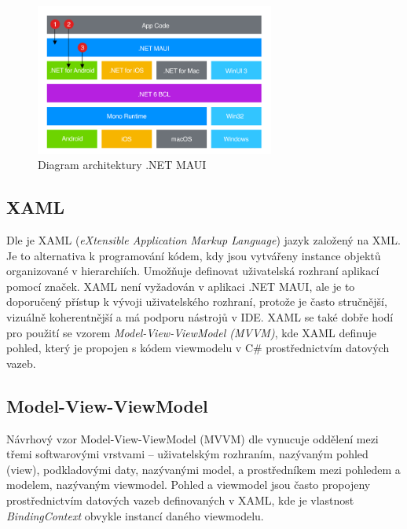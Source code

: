\begin{figure}[hbt]
\centering
\includegraphics[width=0.7\textwidth]{obrazky-figures/maui-architecture.png}
\caption{Diagram architektury .NET MAUI}
\label{mauiArchitectureDiagra}
\end{figure}

\subsection{XAML}
Dle \cite{xaml} je XAML ({\it eXtensible Application Markup Language}) jazyk založený na XML. Je to alternativa k programování kódem, kdy jsou vytvářeny instance objektů organizované v hierarchiích. Umožňuje definovat uživatelská rozhraní aplikací pomocí značek. XAML není vyžadován v aplikaci .NET MAUI, ale je to doporučený přístup k vývoji uživatelského rozhraní, protože je často stručnější, vizuálně koherentnější a má podporu nástrojů v IDE. XAML se také dobře hodí pro použití se vzorem {\it Model-View-ViewModel (MVVM)}, kde XAML definuje pohled, který je propojen s kódem viewmodelu v C\# prostřednictvím datových vazeb.

\subsection{Model-View-ViewModel}
Návrhový vzor Model-View-ViewModel (MVVM) dle \cite{mvvm} vynucuje oddělení mezi třemi softwarovými vrstvami – uživatelským rozhraním, nazývaným pohled (view), podkladovými daty, nazývanými model, a prostředníkem mezi pohledem a modelem, nazývaným viewmodel. Pohled a viewmodel jsou často propojeny prostřednictvím datových vazeb definovaných v XAML, kde je vlastnost {\it BindingContext} obvykle instancí daného viewmodelu.



